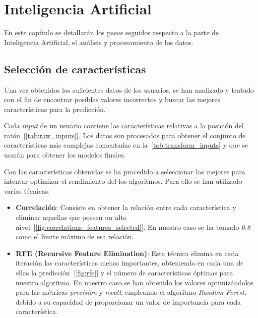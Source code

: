 \chapter{Inteligencia Artificial}
\label{sec:ia}

En este capítulo se detallarán los pasos seguidos respecto a la parte de Inteligencia Artificial, el análisis y procesamiento de los datos.


\section{Selección de características}
\label{sec:ia:feature_selection}

Una vez obtenidos los suficientes datos de los usuarios, se han analizado y tratado con el fin de encontrar  posibles valores incorrectos y buscar las mejores características para la predicción.

Cada \textit{input} de un usuario contiene las características relativas a la posición del ratón~[\cref{tab:raw_inputs}]. Los datos son procesados para obtener el conjunto de características más complejas comentadas en la~\cref{tab:transform_inputs} y que se usarán para obtener los modelos finales.


Con las características obtenidas se ha procedido a seleccionar las mejores para intentar optimizar el rendimiento del los algoritmos. Para ello se han utilizado varias técnicas:

\begin{itemize}[noitemsep]
    \item \textbf{Correlación}: Consiste en obtener la relación entre cada característica y eliminar aquellas que poseen un alto nivel~[\cref{fig:correlations_features_selected}]. En nuestro caso se ha tomado \textit{0.8} como el límite máximo de esa relación.
    
    \item \textbf{RFE (Recursive Feature Elimination)}: Esta técnica elimina en cada iteración las características menos importantes, obteniendo en cada una de ellas la predicción~[\cref{fig:rfe}] y el número de características óptimas para nuestro algoritmo. En nuestro caso se han obtenido los valores optimizándolos para las métricas \textit{precision} y \textit{recall}, empleando el algoritmo \textit{Random Forest}, debido a su capacidad de proporcionar un valor de importancia para cada característica.
    
\end{itemize}

